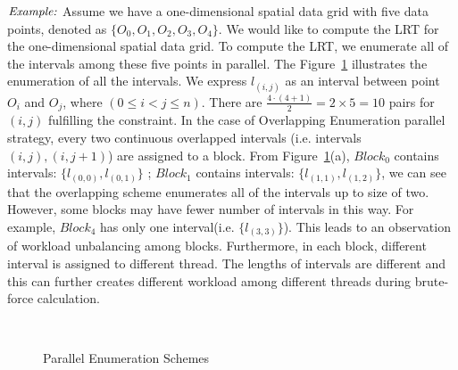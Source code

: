 \documentclass[AMA,LATO1COL]{WileyNJD-v2-bak}
\begin{document}
$\noindent \textit {Example:}$ Assume we have a one-dimensional spatial data grid with  five data points, denoted as $\{O_0,O_1,O_2,O_3,O_4\}$. We would like to compute the LRT for the one-dimensional spatial data grid. To compute the LRT, we enumerate all of the intervals among these five points in parallel. The Figure~\ref{example1} illustrates the enumeration of all the intervals.
 We express $l_{(i,j)}$ as an interval between point $O_i$ and $O_j$, where $ (0 \leq i <j \leq n)$.  There are ${\frac{4 \cdot (4+1)}{2}}=2\times 5=10$ pairs for $(i,j)$ fulfilling  the constraint.  In the case of Overlapping Enumeration parallel strategy, every two continuous overlapped intervals (i.e. intervals $(i,j),(i,j+1)$) are assigned to a block. From Figure~\ref{example1}(a), $Block_0$ contains intervals: $\{l_{(0,0)},l_{(0,1)}\}$ ; $Block_1$ contains intervals: $\{l_{(1,1)},l_{(1,2)}\}$, we can see that the overlapping scheme enumerates all of the intervals up to size of two. However, some blocks may have fewer number of intervals in this way. For example, $Block_4$ has only one interval(i.e. $\{l_{(3,3)}\}$). This leads to an observation of workload unbalancing among blocks. Furthermore, in each block, different interval is assigned to different thread. The lengths of intervals are different and this can further creates different workload among different threads during brute-force calculation.
\begin{figure}[t]
\centering
{}
~~\\
\caption{Parallel Enumeration Schemes\label{example1}}
\end{figure}
\end{document}
